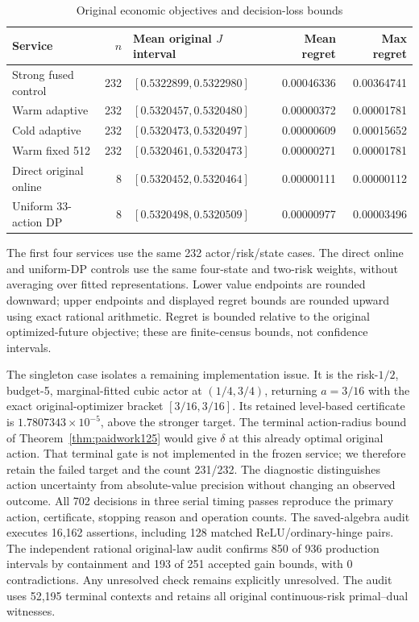 \begin{table}[t]
\centering\small
\caption{Original economic objectives and decision-loss bounds}
\label{tab:economics125}
\begin{tabular}{lrlrr}
\hline
Service & $n$ & Mean original $J$ interval & Mean regret & Max regret \\
\hline
Strong fused control & 232 & $[0.5322899,0.5322980]$ & 0.00046336 & 0.00364741 \\
Warm adaptive & 232 & $[0.5320457,0.5320480]$ & 0.00000372 & 0.00001781 \\
Cold adaptive & 232 & $[0.5320473,0.5320497]$ & 0.00000609 & 0.00015652 \\
Warm fixed 512 & 232 & $[0.5320461,0.5320473]$ & 0.00000271 & 0.00001781 \\
Direct original online & 8 & $[0.5320452,0.5320464]$ & 0.00000111 & 0.00000112 \\
Uniform 33-action DP & 8 & $[0.5320498,0.5320509]$ & 0.00000977 & 0.00003496 \\
\hline\end{tabular}
\par\smallskip\parbox{0.96\textwidth}{\footnotesize The first four services use the same 232 actor/risk/state cases. The direct online and uniform-DP controls use the same four-state and two-risk weights, without averaging over fitted representations. Lower value endpoints are rounded downward; upper endpoints and displayed regret bounds are rounded upward using exact rational arithmetic. Regret is bounded relative to the original optimized-future objective; these are finite-census bounds, not confidence intervals.}
\end{table}
The singleton case isolates a remaining implementation issue. It is the risk-$1/2$, budget-5, marginal-fitted cubic actor at $(1/4,3/4)$, returning $a=3/16$ with the exact original-optimizer bracket $[3/16,3/16]$. Its retained level-based certificate is $1.7807343\times10^{-5}$, above the stronger target. The terminal action-radius bound of Theorem~\ref{thm:paidwork125} would give $\delta$ at this already optimal original action. That terminal gate is not implemented in the frozen service; we therefore retain the failed target and the count 231/232. The diagnostic distinguishes action uncertainty from absolute-value precision without changing an observed outcome.
All 702 decisions in three serial timing passes reproduce the primary action, certificate, stopping reason and operation counts. The saved-algebra audit executes 16,162 assertions, including 128 matched ReLU/ordinary-hinge pairs. The independent rational original-law audit confirms 850 of 936 production intervals by containment and 193 of 251 accepted gain bounds, with 0 contradictions. Any unresolved check remains explicitly unresolved. The audit uses 52,195 terminal contexts and retains all original continuous-risk primal--dual witnesses.

